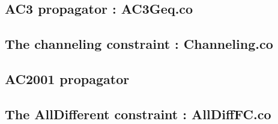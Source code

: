\documentclass{eplDoc}
\begin{document}
\subsection{AC3 propagator : AC3Geq.co} %

\subsection{The channeling constraint : Channeling.co} %

\subsection{AC2001 propagator} %

\subsection{The AllDifferent constraint : AllDiffFC.co} %
\end{document}

